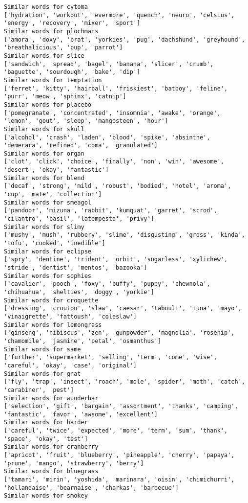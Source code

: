 \documentclass[11pt]{article}
\begin{document}
\begin{Verbatim}[commandchars=\\\{\}]
Similar words for cytoma
['hydration', 'workout', 'evermore', 'quench', 'neuro', 'celsius', 'energy', 'recovery', 'mixer', 'sport']
Similar words for plochmans
['amora', 'doxy', 'brat', 'yorkies', 'pug', 'dachshund', 'greyhound', 'breathalicious', 'pup', 'parrot']
Similar words for slice
['sandwich', 'spread', 'bagel', 'banana', 'slicer', 'crumb', 'baguette', 'sourdough', 'bake', 'dip']
Similar words for temptation
['ferret', 'kitty', 'hairball', 'friskiest', 'batboy', 'feline', 'purr', 'meow', 'sphinx', 'catnip']
Similar words for placebo
['pomegranate', 'concentrated', 'insomnia', 'awake', 'orange', 'lemon', 'gout', 'sleep', 'mangosteen', 'hour']
Similar words for skull
['alcohol', 'crash', 'laden', 'blood', 'spike', 'absinthe', 'demerara', 'refined', 'coma', 'granulated']
Similar words for organ
['clot', 'click', 'choice', 'finally', 'non', 'win', 'awesome', 'desert', 'okay', 'fantastic']
Similar words for blend
['decaf', 'strong', 'mild', 'robust', 'bodied', 'hotel', 'aroma', 'cup', 'mate', 'collection']
Similar words for smeagol
['pandoor', 'mizuna', 'rabbit', 'kumquat', 'garret', 'scrod', 'cilantro', 'basil', 'latempesta', 'privy']
Similar words for slimy
['mushy', 'mush', 'rubbery', 'slime', 'disgusting', 'gross', 'kinda', 'tofu', 'cooked', 'inedible']
Similar words for eclipse
['spry', 'dentine', 'trident', 'orbit', 'sugarless', 'xylichew', 'stride', 'dentist', 'mentos', 'bazooka']
Similar words for sophies
['cavalier', 'pooch', 'foxy', 'buffy', 'puppy', 'chewnola', 'chihuahua', 'shelties', 'doggy', 'yorkie']
Similar words for croquette
['dressing', 'crouton', 'slaw', 'caesar', 'tabouli', 'tuna', 'mayo', 'vinaigrette', 'fattoush', 'coleslaw']
Similar words for lemongrass
['ginseng', 'hibiscus', 'zen', 'gunpowder', 'magnolia', 'rosehip', 'chamomile', 'jasmine', 'petal', 'osmanthus']
Similar words for same
['further', 'supermarket', 'selling', 'term', 'come', 'wise', 'careful', 'okay', 'case', 'original']
Similar words for gnat
['fly', 'trap', 'insect', 'roach', 'mole', 'spider', 'moth', 'catch', 'carabiner', 'pest']
Similar words for wunderbar
['selection', 'gift', 'bargain', 'assortment', 'thanks', 'camping', 'fantastic', 'favor', 'awsome', 'excellent']
Similar words for harder
['careful', 'twice', 'expected', 'more', 'term', 'sum', 'thank', 'space', 'okay', 'test']
Similar words for cranberry
['apricot', 'fruit', 'blueberry', 'pineapple', 'cherry', 'papaya', 'prune', 'mango', 'strawberry', 'berry']
Similar words for bluegrass
['tamari', 'mirin', 'yoshida', 'marinara', 'oisin', 'chimichurri', 'hollandaise', 'bearnaise', 'charkas', 'barbecue']
Similar words for smokey

\end{Verbatim}
\end{document}
